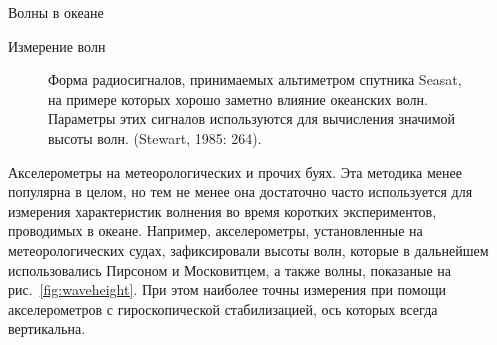 \begin{chapter}{Волны в океане}
\begin{section}{Измерение волн}
\begin{figure}[t!]
\caption{Форма радиосигналов, принимаемых альтиметром спутника
Seasat, на примере которых хорошо заметно влияние океанских волн.
Параметры этих сигналов используются для вычисления значимой высоты волн.
(Stewart, 1985: 264).}
\label{fig:altimeterpulse}
\end{figure}
%

\begin{paragraph}{Акселерометры на метеорологических и прочих буях.} 
Эта методика менее популярна в целом, но тем не менее она достаточно часто
используется для измерения характеристик волнения во время коротких 
экспериментов, проводимых в океане. Например, акселерометры, установленные
на метеорологических судах, зафиксировали высоты волн, которые в дальнейшем
использовались Пирсоном и Московитцем, а также волны, показаные на 
рис.~\ref{fig:waveheight}. При этом наиболее точны измерения при помощи
акселерометров с гироскопической стабилизацией, ось которых всегда 
вертикальна.
%


\end{paragraph}
\end{section}
\end{chapter}
